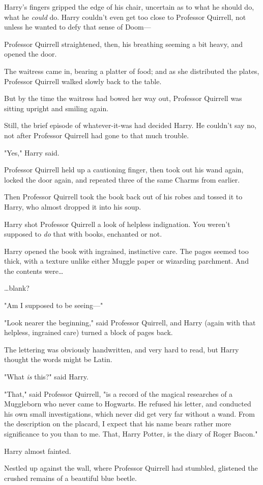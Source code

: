 Harry's fingers gripped the edge of his chair, uncertain as to what he should 
do, what he \emph{could} do. Harry couldn't even get too close to Professor 
Quirrell, not unless he wanted to defy that sense of Doom---

Professor Quirrell straightened, then, his breathing seeming a bit heavy, and 
opened the door.

The waitress came in, bearing a platter of food; and as she distributed the 
plates, Professor Quirrell walked slowly back to the table.

But by the time the waitress had bowed her way out, Professor Quirrell was 
sitting upright and smiling again.

Still, the brief episode of whatever-it-was had decided Harry. He couldn't say 
no, not after Professor Quirrell had gone to that much trouble.

"Yes," Harry said.

Professor Quirrell held up a cautioning finger, then took out his wand again, 
locked the door again, and repeated three of the same Charms from earlier.

Then Professor Quirrell took the book back out of his robes and tossed it to 
Harry, who almost dropped it into his soup.

Harry shot Professor Quirrell a look of helpless indignation. You weren't 
supposed to \emph{do} that with books, enchanted or not.

Harry opened the book with ingrained, instinctive care. The pages seemed too 
thick, with a texture unlike either Muggle paper or wizarding parchment. And 
the contents were{\ldots}

{\ldots}blank?

"Am I supposed to be seeing---"

"Look nearer the beginning," said Professor Quirrell, and Harry (again with 
that helpless, ingrained care) turned a block of pages back.

The lettering was obviously handwritten, and very hard to read, but Harry 
thought the words might be Latin.

"What \emph{is} this?" said Harry.

"That," said Professor Quirrell, "is a record of the magical researches of a 
Muggleborn who never came to Hogwarts. He refused his letter, and conducted his 
own small investigations, which never did get very far without a wand. From the 
description on the placard, I expect that his name bears rather more 
significance to you than to me. That, Harry Potter, is the diary of Roger 
Bacon."

Harry almost fainted.

Nestled up against the wall, where Professor Quirrell had stumbled, glistened 
the crushed remains of a beautiful blue beetle.